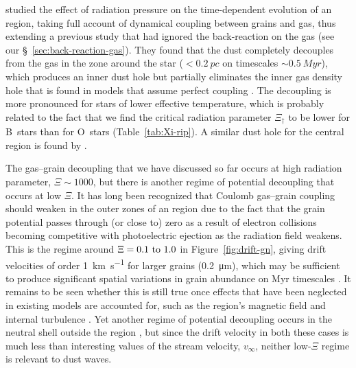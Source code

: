 \citet{Akimkin:2017a} studied the effect of radiation pressure on the
time-dependent evolution of an \hii{} region, taking full account of
dynamical coupling between grains and gas, thus extending a previous
study \citep{Akimkin:2015a} that had ignored the back-reaction on the
gas (see our \S~\ref{sec:back-reaction-gas}).  They found that the
dust completely decouples from the gas in the zone around the star
(\(< \SI{0.2}{pc}\) on timescales \(\sim \SI{0.5}{Myr}\)), which produces
an inner dust hole but partially eliminates the inner gas density hole
that is found in models that assume perfect coupling
\citep{Mathews:1967a, Draine:2011a, Kim:2016b}. The decoupling is more
pronounced for stars of lower effective temperature, which is probably
related to the fact that we find the critical radiation parameter
\(\Xi_\dag\) to be lower for B~stars than for O~stars
(Table~\ref{tab:Xi-rip}).  A similar dust hole for the central region
is found by \citet{Ishiki:2018a}.

The gas--grain decoupling that we have discussed so far occurs at high
radiation parameter, \(\Xi \sim 1000\), but there is another regime of
potential decoupling that occurs at low \(\Xi\).  It has long been
recognized \citep{Gail:1979a} that Coulomb gas--grain coupling should
weaken in the outer zones of an \hii{} region due to the fact that the
grain potential passes through (or close to) zero as a result of
electron collisions becoming competitive with photoelectric ejection
as the radiation field weakens.  This is the regime around
\(\Xi = \text{\numrange{0.1}{1.0}}\) in Figure~\ref{fig:drift-gn},
giving drift velocities of order \SI{1}{km.s^{-1}} for larger grains
(\SI{0.2}{\um}), which may be sufficient to produce significant
spatial variations in grain abundance on Myr timescales
\citep{Ishiki:2018a}. It remains to be seen whether this is still true
once effects that have been neglected in existing models are accounted
for, such as the \hii{} region's magnetic field \citep{Krumholz:2007a,
  Arthur:2011a, Gendelev:2012a} and internal turbulence
\citep{Arthur:2016a}.  Yet another regime of potential decoupling
occurs in the neutral shell outside the \hii{} region
\citep{Gustafsson:2018a}, but since the drift velocity in both these
cases is much less than interesting values of the stream velocity,
\(v_\infty\), neither low-\(\Xi\) regime is relevant to dust waves.

